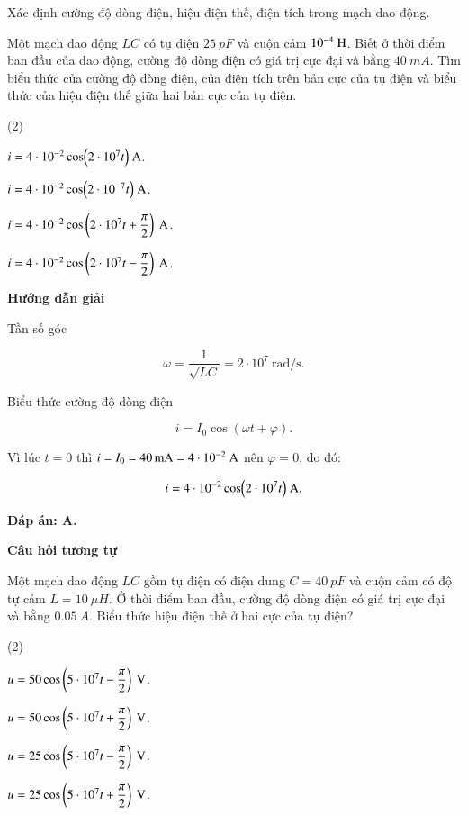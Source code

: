 \begin{dang}{Xác định cường độ dòng điện, hiệu điện thế, điện tích trong mạch dao động.}
{		Một mạch dao động $LC$ có tụ điện $\SI{25}{pF}$ và cuộn cảm $10^{-4}\ \text H$. Biết ở thời điểm ban đầu của dao động, cường độ dòng điện có giá trị cực đại và bằng $\SI{40}{mA}$. Tìm biểu thức của cường độ dòng điện, của điện tích trên bản cực của tụ điện và biểu thức của hiệu điện thế giữa hai bản cực của tụ điện.
		\begin{mcq}(2)
			\item $i = 4\cdot 10^{-2} \cos(2 \cdot 10^7 t)\ \text A$. 
			\item $i = 4\cdot 10^{-2} \cos(2 \cdot 10^{-7} t)\ \text A$. 
			\item $i = 4\cdot 10^{-2} \cos \left(2 \cdot 10^7 t + \dfrac{\pi}{2}\right)\ \text A$. 
			\item $i = 4\cdot 10^{-2} \cos \left(2 \cdot 10^7 t - \dfrac{\pi}{2}\right)\ \text A$. 
		\end{mcq}
	}
	{	\begin{center}
			\textbf{Hướng dẫn giải}
		\end{center}
		
		Tần số góc 
		
		$$\omega  = \dfrac{1}{\sqrt{LC}} = 2 \cdot 10^7\ \text{rad/s}.$$
		
		Biểu thức cường độ dòng điện 
		
		$$i = I_0 \cos (\omega t + \varphi).$$
		
		Vì lúc $t = 0$ thì $i = I_0 = \SI{40}{mA} = 4 \cdot 10^{-2}\ \text A$ nên $\varphi = 0$, do đó: 
		
		$$i = 4\cdot 10^{-2} \cos (2 \cdot 10^7 t)\ \text A.$$
		
		\textbf{Đáp án: A.}
		
		
		\begin{center}
			\textbf{Câu hỏi tương tự}
		\end{center}
		
		Một mạch dao động $LC$ gồm tụ điện có điện dung $C = \SI{40}{pF}$ và cuộn cảm có độ tự cảm $L = \SI{10}{\mu H}$. Ở thời điểm ban đầu, cường độ dòng điện có giá trị cực đại và bằng $\SI{0,05}{A}$. Biểu thức hiệu điện thế ở hai cực của tụ điện?
		
		\begin{mcq}(2)
			\item $u = 50 \cos \left(5 \cdot 10^7 t - \dfrac{\pi}{2}\right)\ \text V$. 
			\item $u = 50 \cos \left(5 \cdot 10^7 t + \dfrac{\pi}{2}\right)\ \text V$. 
			\item $u = 25 \cos \left(5 \cdot 10^7 t - \dfrac{\pi}{2}\right)\ \text V$. 
			\item $u = 25 \cos \left(5 \cdot 10^7 t + \dfrac{\pi}{2}\right)\ \text V$. 
		\end{mcq}
		
}
\end{dang}
